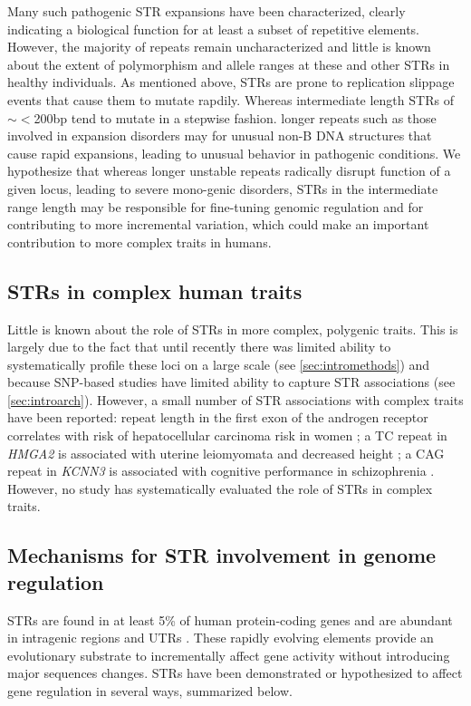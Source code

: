 Many such pathogenic STR expansions have been characterized, clearly indicating a biological function for at least a subset of repetitive elements. However, the majority of repeats remain uncharacterized and little is known about the extent of polymorphism and allele ranges at these and other STRs in healthy individuals. As mentioned above, STRs are prone to replication slippage events that cause them to mutate rapdily. Whereas intermediate length STRs of $\sim<$200bp tend to mutate in a stepwise fashion. longer repeats such as those involved in expansion disorders may for unusual non-B DNA structures \cite{KozlowskiSobczakKrzyzosiak2010} that cause rapid expansions, leading to unusual behavior in pathogenic conditions. We hypothesize that whereas longer unstable repeats radically disrupt function of a given locus, leading to severe mono-genic disorders, STRs in the intermediate range length may be responsible for fine-tuning genomic regulation and for contributing to more incremental variation, which could make an important contribution to more complex traits in humans.

\subsection{STRs in complex human traits}
Little is known about the role of STRs in more complex, polygenic traits. This is largely due to the fact that until recently there was limited ability to systematically profile these loci on a large scale (see \ref{sec:intromethods}) and because SNP-based studies have limited ability to capture STR associations (see \ref{sec:introarch}). However, a small number of STR associations with complex traits have been reported: repeat length in the first exon of the androgen receptor correlates with risk of hepatocellular carcinoma risk in women \cite{YuYangYangEtAl2002}; a TC repeat in \emph{HMGA2} is associated with uterine leiomyomata and decreased height \cite{HodgeTCuencoHuyckEtAl2009}; a CAG repeat in \emph{KCNN3} is associated with cognitive performance in schizophrenia \cite{GrubeGerchenAdamcioEtAl2011}. However, no study has systematically evaluated the role of STRs in complex traits.

\subsection{Mechanisms for STR involvement in genome regulation}
STRs are found in at least 5\% of human protein-coding genes \cite{ODushlaineEdwardsParkEtAl2005} and are abundant in intragenic regions and UTRs \cite{LiKorolFahimaEtAl2004}. These rapidly evolving elements provide an evolutionary substrate to incrementally affect gene activity without introducing major sequences changes. STRs have been demonstrated or hypothesized to affect gene regulation in several ways, summarized below. %

